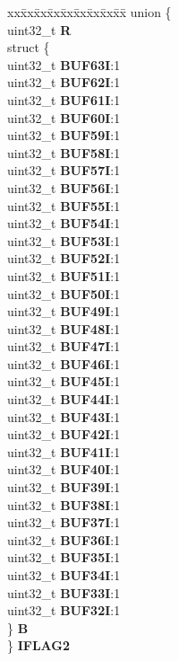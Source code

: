 \begin{DoxyCompactItemize}
\begin{tabbing}
\end{tabbing}\item 
\mbox{\label{structFLEXCAN__tag_a0d89a89766ea29ec873ec061cf1bb0ff}} 
\begin{tabbing}
xx\=xx\=xx\=xx\=xx\=xx\=xx\=xx\=xx\=\kill
union \{\\
\>uint32\_t {\bfseries R}\\
\>struct \{\\
\>\>uint32\_t {\bfseries BUF63I}:1\\
\>\>uint32\_t {\bfseries BUF62I}:1\\
\>\>uint32\_t {\bfseries BUF61I}:1\\
\>\>uint32\_t {\bfseries BUF60I}:1\\
\>\>uint32\_t {\bfseries BUF59I}:1\\
\>\>uint32\_t {\bfseries BUF58I}:1\\
\>\>uint32\_t {\bfseries BUF57I}:1\\
\>\>uint32\_t {\bfseries BUF56I}:1\\
\>\>uint32\_t {\bfseries BUF55I}:1\\
\>\>uint32\_t {\bfseries BUF54I}:1\\
\>\>uint32\_t {\bfseries BUF53I}:1\\
\>\>uint32\_t {\bfseries BUF52I}:1\\
\>\>uint32\_t {\bfseries BUF51I}:1\\
\>\>uint32\_t {\bfseries BUF50I}:1\\
\>\>uint32\_t {\bfseries BUF49I}:1\\
\>\>uint32\_t {\bfseries BUF48I}:1\\
\>\>uint32\_t {\bfseries BUF47I}:1\\
\>\>uint32\_t {\bfseries BUF46I}:1\\
\>\>uint32\_t {\bfseries BUF45I}:1\\
\>\>uint32\_t {\bfseries BUF44I}:1\\
\>\>uint32\_t {\bfseries BUF43I}:1\\
\>\>uint32\_t {\bfseries BUF42I}:1\\
\>\>uint32\_t {\bfseries BUF41I}:1\\
\>\>uint32\_t {\bfseries BUF40I}:1\\
\>\>uint32\_t {\bfseries BUF39I}:1\\
\>\>uint32\_t {\bfseries BUF38I}:1\\
\>\>uint32\_t {\bfseries BUF37I}:1\\
\>\>uint32\_t {\bfseries BUF36I}:1\\
\>\>uint32\_t {\bfseries BUF35I}:1\\
\>\>uint32\_t {\bfseries BUF34I}:1\\
\>\>uint32\_t {\bfseries BUF33I}:1\\
\>\>uint32\_t {\bfseries BUF32I}:1\\
\>\} {\bfseries B}\\
\} {\bfseries IFLAG2}\\


\end{tabbing}
\end{DoxyCompactItemize}
